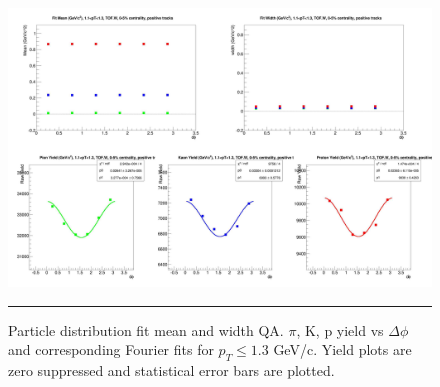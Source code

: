 \begin{figure}[h]
  \centering
    \includegraphics[width=1\textwidth]{lowptfits/fitParams_tof1_cent0_ch1_pT-11-13.jpg}
    \rule{35em}{0.5pt}
  \caption[Particle distribution fit mean and width QA. $\pi$, K, p yield vs $\Delta \phi$ and corresponding Fourier fits for $p_T\leq 1.3$ GeV/c.]{Particle distribution fit mean and width QA. $\pi$, K, p yield vs $\Delta \phi$ and corresponding Fourier fits for $p_T\leq 1.3$ GeV/c. Yield plots are zero suppressed and statistical error bars are plotted.}
  \label{fig:yieldphisinglegaus}
\end{figure}

